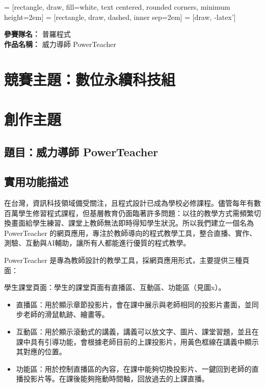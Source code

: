 \documentclass[12pt]{article}
\begin{document}
\setlength{\parskip}{-6pt}
\date{}
\usetikzlibrary{automata, positioning, arrows, shapes, fit}
{}
 = [rectangle, draw, fill=white, 
    text centered, rounded corners, minimum height=2em]
 = [rectangle, draw, dashed, inner sep=2em]
 = [draw, -latex']
\setlength{\parindent}{2em}

\noindent
\textbf{參賽隊名：} 普羅程式 \\
\textbf{作品名稱：} 威力導師 PowerTeacher

\section{競賽主題：數位永續科技組}

\section{創作主題}
\subsection{題目：威力導師 PowerTeacher}

\subsection{實用功能描述}
在台灣，資訊科技領域備受關注，且程式設計已成為學校必修課程。儘管每年有數百萬學生修習程式課程，但基層教育仍面臨著許多問題：以往的教學方式需頻繁切換畫面給學生練習、課堂上教師無法即時得知學生狀況。所以我們建立一個名為 PowerTeacher 的網頁應用，專注於教師導向的程式教學工具，整合直播、實作、測驗、互動與AI輔助，讓所有人都能進行優質的程式教學。\\
\par PowerTeacher 是專為教師設計的教學工具，採網頁應用形式，主要提供三種頁面：\\
\par 學生課堂頁面：學生的課堂頁面有直播區、互動區、功能區（見圖x）。
\begin{itemize}
  \item 直播區：用於顯示章節投影片，會在課中展示與老師相同的投影片畫面，並同步老師的滑鼠軌跡、繪畫等。
  \item 互動區：用於顯示滾動式的講義，講義可以放文字、圖片、課堂習題，並且在課中具有引導功能，會根據老師目前的上課投影片，用黃色框線在講義中顯示其對應的位置。
  \item 功能區：用於控制直播區的內容，在課中能夠切換投影片、一鍵回到老師的直播投影片等。在課後能夠拖動時間軸，回放過去的上課直播。
\end{itemize}
\end{document}
